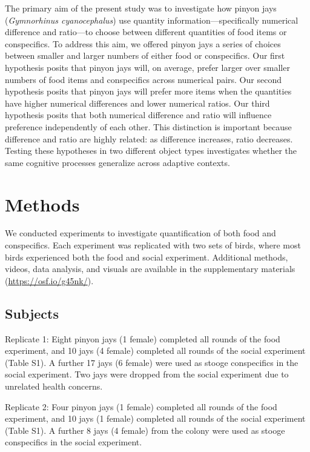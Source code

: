 \documentclass[
  ,doc,floatsintext]{apa6}
\begin{document}
The primary aim of the present study was to investigate how pinyon jays (\emph{Gymnorhinus cyanocephalus}) use quantity information---specifically numerical difference and ratio---to choose between different quantities of food items or conspecifics. To address this aim, we offered pinyon jays a series of choices between smaller and larger numbers of either food or conspecifics. Our first hypothesis posits that pinyon jays will, on average, prefer larger over smaller numbers of food items and conspecifics across numerical pairs. Our second hypothesis posits that pinyon jays will prefer more items when the quantities have higher numerical differences and lower numerical ratios. Our third hypothesis posits that both numerical difference and ratio will influence preference independently of each other. This distinction is important because difference and ratio are highly related: as difference increases, ratio decreases. Testing these hypotheses in two different object types investigates whether the same cognitive processes generalize across adaptive contexts.

\hypertarget{methods}{%
\section{Methods}\label{methods}}

We conducted experiments to investigate quantification of both food and conspecifics. Each experiment was replicated with two sets of birds, where most birds experienced both the food and social experiment. Additional methods, videos, data analysis, and visuals are available in the supplementary materials (\url{https://osf.io/g45nk/}).

\hypertarget{subjects}{%
\subsection{Subjects}\label{subjects}}

Replicate 1: Eight pinyon jays (1 female) completed all rounds of the food experiment, and 10 jays (4 female) completed all rounds of the social experiment (Table S1). A further 17 jays (6 female) were used as stooge conspecifics in the social experiment. Two jays were dropped from the social experiment due to unrelated health concerns.

Replicate 2: Four pinyon jays (1 female) completed all rounds of the food experiment, and 10 jays (1 female) completed all rounds of the social experiment (Table S1). A further 8 jays (4 female) from the colony were used as stooge conspecifics in the social experiment.
\end{document}
